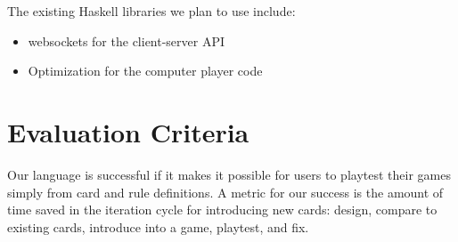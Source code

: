 \documentclass{acm_proc_article-sp}
\begin{document}
The existing Haskell libraries we plan to use include:

\begin{itemize}
\item websockets \textendash  for the client-server API
\item Optimization \textendash  for the computer player code
\end{itemize}
\section{Evaluation Criteria}
\label{sec:evaluation}
Our language is successful if it makes it possible for users to playtest their
games simply from card and rule definitions. A metric for our success is the
amount of time saved in the iteration cycle for introducing new cards: design,
compare to existing cards, introduce into a game, playtest, and fix.

\begin{biblist}
\end{biblist}

\end{document}

